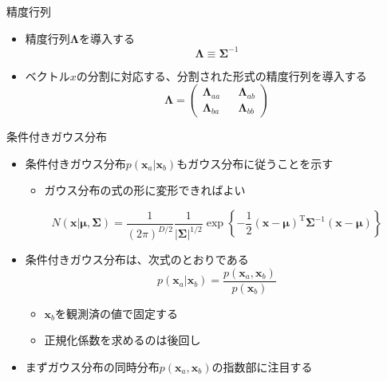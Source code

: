 \begin{frame}{精度行列}
 \begin{itemize}
  \item \alert{精度行列}$\bm{\Lambda}$を導入する
        \begin{equation}
         \bm{\Lambda} \equiv \bm{\Sigma}^{-1}
        \end{equation}

  \item ベクトル$x$の分割に対応する、分割された形式の精度行列を導入する
        \begin{equation}
         \bm{\Lambda}=
          \begin{pmatrix}
           \bm{\Lambda}_{aa} && \bm{\Lambda}_{ab}\\
           \bm{\Lambda}_{ba} && \bm{\Lambda}_{bb}
          \end{pmatrix}
        \end{equation}
 \end{itemize}
\end{frame}


\begin{frame}{条件付きガウス分布}
 \begin{itemize}
  \item 条件付きガウス分布$p(\bm{x}_a|\bm{x}_b)$もガウス分布に従うことを示す
        \begin{itemize}
         \item ガウス分布の式の形に変形できればよい
        \end{itemize}
        \begin{equation}
         N(\bm{x}|\bm{\mu},\bm{\Sigma}) = \frac{1}{(2\pi)^{D/2}}\frac{1}{|\bm{\Sigma}|^{1/2}}\exp\left\{-\frac{1}{2}(\bm{x} - \bm{\mu})^{\mathrm{T}}\bm{\Sigma}^{-1}(\bm{x}-\bm{\mu})\right\}
        \end{equation}
  \item 条件付きガウス分布は、次式のとおりである
        \begin{equation}
         p(\bm{x}_a | \bm{x}_b) = \frac{p(\bm{x}_a, \bm{x}_b)}{p(\bm{x}_b)}
        \end{equation}
        \begin{itemize}
         \item $\bm{x}_b$を観測済の値で\alert{固定}する
         \item 正規化係数を求めるのは後回し
        \end{itemize}
  \item まずガウス分布の同時分布$p(\bm{x}_a,\bm{x}_b)$の指数部に注目する
 \end{itemize}
\end{frame}

